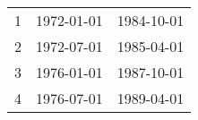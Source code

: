 % 
\begin{tabular}{ccc}
  \hline
  \hline
1 & 1972-01-01 & 1984-10-01 \\ 
  2 & 1972-07-01 & 1985-04-01 \\ 
  3 & 1976-01-01 & 1987-10-01 \\ 
  4 & 1976-07-01 & 1989-04-01 \\ 
   \hline
\end{tabular}
